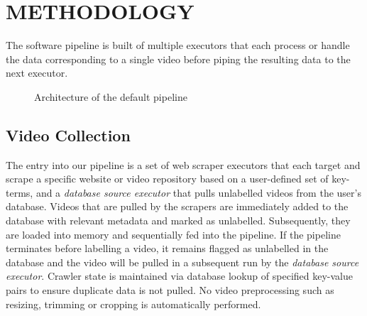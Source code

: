 \documentclass[letterpaper, 10 pt, conference]{IEEEconf}
\begin{document}
\section{METHODOLOGY}

The software pipeline is built of multiple executors that each process or handle the data corresponding to a single video before piping the resulting data to the next executor.


\begin{figure}[htpb]
		\centering
		\caption{Architecture of the default pipeline}
		\label{fig:obj-by-class}
\end{figure}


\subsection{Video Collection}

The entry into our pipeline is a set of web scraper executors that each target and scrape a specific website or video repository based on a user-defined set of key-terms, and a \textit{database source executor} that pulls unlabelled videos from the user's database. Videos that are pulled by the scrapers are immediately added to the database with relevant metadata and marked as unlabelled. Subsequently, they are loaded into memory and sequentially fed into the pipeline. If the pipeline terminates before labelling a video, it remains flagged as unlabelled in the database and the video will be pulled in a subsequent run by the \textit{database source executor}. Crawler state is maintained via database lookup of specified key-value pairs to ensure duplicate data is not pulled. No video preprocessing such as resizing, trimming or cropping is automatically performed.
\end{document}
